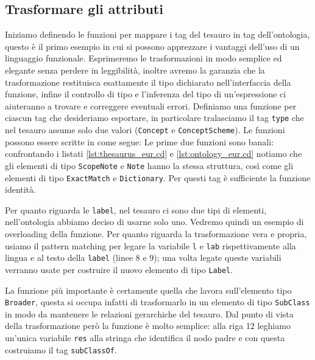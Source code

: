 \subsection{Trasformare gli attributi}
Iniziamo definendo le funzioni per mappare i tag del tesauro in tag dell'ontologia, questo è il primo esempio in cui si possono apprezzare i vantaggi dell'uso di un linguaggio funzionale. Esprimeremo le trasformazioni in modo semplice ed elegante senza perdere in leggibilità, inoltre avremo la garanzia che la trasformazione restituisca esattamente il tipo dichiarato nell'interfaccia della funzione, infine il controllo di tipo e l'inferenza del tipo di un'espressione ci aiuteranno a trovare e correggere eventuali errori. Definiamo una funzione per ciascun tag che desideriamo esportare, in particolare tralasciamo il tag \verb|type| che nel tesauro assume solo due valori (\verb|Concept| e \verb|ConceptScheme|). Le funzioni possono essere scritte in \cduce come segue:
Le prime due funzioni sono banali: confrontando i listati \ref{lst:thesaurus_eur.cd} e \ref{lst:ontology_eur.cd} notiamo che gli elementi di tipo \verb|ScopeNote| e \verb|Note| hanno la stessa struttura, così come gli elementi di tipo \verb|ExactMatch| e \verb|Dictionary|. Per questi tag è sufficiente la funzione identità.

Per quanto riguarda le \verb|label|, nel tesauro ci sono due tipi di elementi, nell'ontologia abbiamo deciso di usarne solo uno. Vedremo quindi un esempio di overloading della funzione. Per quanto riguarda la trasformazione vera e propria, usiamo il pattern matching per legare la variabile \verb|l| e \verb|lab| rispettivamente alla lingua e al testo della \verb|label| (linee 8 e 9); una volta legate queste variabili verranno usate per costruire il nuovo elemento di tipo \verb|Label|.

La funzione più importante è certamente quella che lavora sull'elemento tipo \verb|Broader|, questa si occupa infatti di trasformarlo in un elemento di tipo \verb|SubClass| in modo da mantenere le relazioni gerarchiche del tesauro. Dal punto di vista della trasformazione però la funzione è molto semplice: alla riga 12 leghiamo un'unica variabile \verb|res| alla stringa che identifica il nodo padre e con questa costruiamo il tag \verb|subClassOf|.
